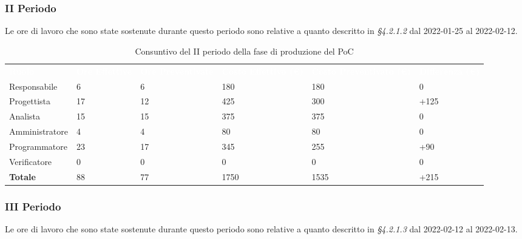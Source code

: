 \subsubsection{II Periodo}
Le ore di lavoro che sono state sostenute durante questo periodo sono relative a quanto descritto in \textit{§4.2.1.2} dal 2022-01-25 al 2022-02-12.

\begin{table}[H]
\begin{center}
\renewcommand{\arraystretch}{1.5}
\begin{tabular}{ m{}<{\centering}  m{}<{\centering} m{}<{\centering} m{}<{\centering} m{}<{\centering} m{}<{\centering}}
	\rowcolor{darkblue}
	\textcolor{white}{\textbf{Ruolo}} & \textcolor{white}{\textbf{Ore Effettive}} & \textcolor{white}{\textbf{Ore Preventivate}}&\textcolor{white}{\textbf{Costo Effettivo (\euro) }}&\textcolor{white}{\textbf{Costo Preventivato (\euro)}}&\textcolor{white}{\textbf{Differenza (\euro)}}\\ 
	
	Responsabile  & 6 & 6 & 180 & 180 & 0 \\	
	
	Progettista & 17 & 12 & 425 & 300 & +125 \\
	
	Analista & 15 & 15 & 375 & 375 & 0 \\

	Amministratore & 4 & 4 & 80 & 80 & 0 \\
	
	Programmatore & 23 & 17 & 345 & 255 &  +90 \\
	
	Verificatore & 0 & 0 & 0 & 0 & 0 \\
	
	\textbf{Totale} & 88 & 77 & 1750 & 1535 & +215 \\
	
\end{tabular}
\caption{Consuntivo del II periodo della fase di produzione del PoC}
\end{center}
\end{table}


\subsubsection{III Periodo}
Le ore di lavoro che sono state sostenute durante questo periodo sono relative a quanto descritto in \textit{§4.2.1.3} dal 2022-02-12 al 2022-02-13.

